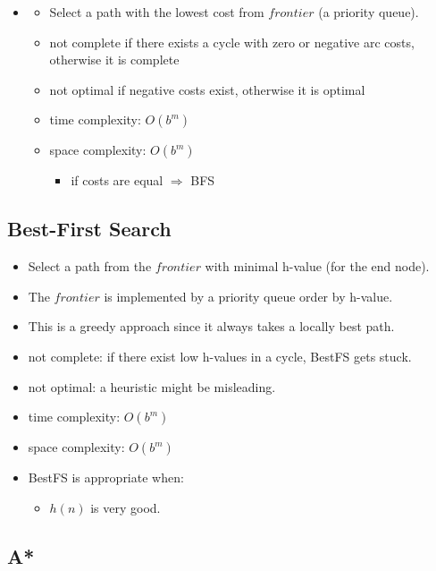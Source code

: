 \documentclass{article}
\begin{document}
\begin{itemize}
    \item
    \begin{itemize}
        \item Select a path with the lowest cost from $frontier$ (a priority queue).
        \item not complete if there exists a cycle with zero or negative arc costs, otherwise it is complete
        \item not optimal if negative costs exist, otherwise it is optimal
        \item time complexity: $O(b^m)$
        \item space complexity: $O(b^m)$
            \begin{itemize}
                \item if costs are equal $\Rightarrow$ BFS
            \end{itemize}
    \end{itemize}
\end{itemize}

\subsection{Best-First Search}

\begin{itemize}
    \item Select a path from the $frontier$ with minimal h-value (for the end node).
    \item The $frontier$ is implemented by a priority queue order by h-value.
    \item This is a greedy approach since it always takes a locally best path.
    \item not complete: if there exist low h-values in a cycle, BestFS gets stuck.
    \item not optimal: a heuristic might be misleading.
    \item time complexity: $O(b^m)$
    \item space complexity: $O(b^m)$
    \item BestFS is appropriate when:
        \begin{itemize}
            \item $h(n)$ is very good.
        \end{itemize}
\end{itemize}

\subsection{A*}
\end{document}
